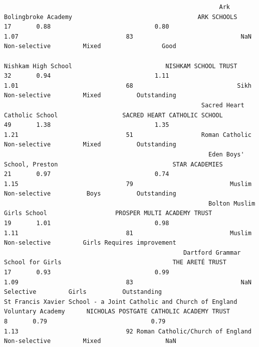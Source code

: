 \documentclass[
  letterpaper,
  DIV=11,
  numbers=noendperiod]{scrartcl}
\begin{document}
\begin{verbatim}
                                                            Ark Bolingbroke Academy                                   ARK SCHOOLS                          17       0.88                             0.80                          1.07                              83                              NaN     Non-selective         Mixed                 Good
                                                                Nishkam High School                          NISHKAM SCHOOL TRUST                          32       0.94                             1.11                          1.01                              68                             Sikh     Non-selective         Mixed          Outstanding
                                                       Sacred Heart Catholic School                  SACRED HEART CATHOLIC SCHOOL                          49       1.38                             1.35                          1.21                              51                   Roman Catholic     Non-selective         Mixed          Outstanding
                                                         Eden Boys' School, Preston                                STAR ACADEMIES                          21       0.97                             0.74                          1.15                              79                           Muslim     Non-selective          Boys          Outstanding
                                                         Bolton Muslim Girls School                   PROSPER MULTI ACADEMY TRUST                          19       1.01                             0.98                          1.11                              81                           Muslim     Non-selective         Girls Requires improvement
                                                  Dartford Grammar School for Girls                               THE ARETÉ TRUST                          17       0.93                             0.99                          1.09                              83                              NaN         Selective         Girls          Outstanding
St Francis Xavier School - a Joint Catholic and Church of England Voluntary Academy      NICHOLAS POSTGATE CATHOLIC ACADEMY TRUST                           8       0.79                             0.79                          1.13                              92 Roman Catholic/Church of England     Non-selective         Mixed                  NaN 
\end{verbatim}
\end{document}
